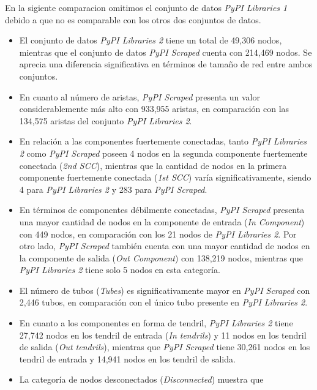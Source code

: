 En la sigiente comparacion omitimos el conjunto de datos \textit{PyPI Libraries 1} debido a que no es comparable con los otros dos conjuntos de datos.

\begin{itemize}
    \item El conjunto de datos \textit{PyPI Libraries 2} tiene un total de 49,306 nodos,
          mientras que el conjunto de datos \textit{PyPI Scraped} cuenta con 214,469 nodos.
          Se aprecia una diferencia significativa en términos de tamaño de red entre ambos conjuntos.
    \item En cuanto al número de aristas, \textit{PyPI Scraped} presenta un valor
          considerablemente más alto con 933,955 aristas, en comparación con las 134,575
          aristas del conjunto \textit{PyPI Libraries 2}.
    \item En relación a las componentes fuertemente conectadas, tanto \textit{PyPI Libraries 2}
          como \textit{PyPI Scraped} poseen 4 nodos en la segunda componente fuertemente
          conectada (\textit{2nd SCC}), mientras que la cantidad de nodos en la primera
          componente fuertemente conectada (\textit{1st SCC}) varía significativamente,
          siendo 4 para \textit{PyPI Libraries 2} y 283 para \textit{PyPI Scraped}.
    \item En términos de componentes débilmente conectadas, \textit{PyPI Scraped}
          presenta una mayor cantidad de nodos en la componente de entrada (\textit{In Component})
          con 449 nodos, en comparación con los 21 nodos de \textit{PyPI Libraries 2}. Por otro
          lado, \textit{PyPI Scraped} también cuenta con una mayor cantidad de nodos en la
          componente de salida (\textit{Out Component}) con 138,219 nodos, mientras que
          \textit{PyPI Libraries 2} tiene solo 5 nodos en esta categoría.
    \item El número de tubos (\textit{Tubes}) es significativamente mayor en
          \textit{PyPI Scraped} con 2,446 tubos, en comparación con el único tubo presente
          en \textit{PyPI Libraries 2}.
    \item En cuanto a los componentes en forma de tendril, \textit{PyPI Libraries 2} tiene
          27,742 nodos en los tendril de entrada (\textit{In tendrils}) y 11 nodos en los
          tendril de salida (\textit{Out tendrils}), mientras que \textit{PyPI Scraped} tiene
          30,261 nodos en los tendril de entrada y 14,941 nodos en los tendril de salida.
    \item La categoría de nodos desconectados (\textit{Disconnected}) muestra que

\end{itemize}

